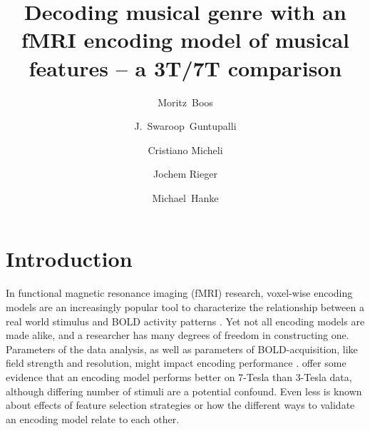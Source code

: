 



\title{Decoding musical genre with an fMRI encoding model of musical
features -- a 3T/7T comparison}


\author[1]{Moritz~Boos}
\author[2]{J.~Swaroop~Guntupalli}
\author[1]{Cristiano Micheli}
\author[1]{Jochem Rieger}
\author[3,4]{Michael~Hanke}

\maketitle
\thispagestyle{fancy}

\listoftodos

\begin{abstract}

\end{abstract}

\clearpage


\section*{Introduction}

In functional magnetic resonance imaging (f{MRI}) research, voxel-wise encoding
models are an increasingly popular tool to characterize the
relationship between a real world stimulus and BOLD activity patterns
\citep{NG11,TD+06,KG+08,SZ09}.
Yet not all encoding models are made alike, and a researcher has many degrees
of freedom in constructing one.
Parameters of the data analysis, as well as parameters of BOLD-acquisition, like field strength and resolution,
might impact encoding performance \citep{KB07,FK12}. \citet{SF14} offer some evidence that an
encoding model performs better on 7-Tesla than 3-Tesla data, although differing
number of stimuli are a potential confound.
Even less is known about effects of feature selection strategies or how
the different ways to validate an encoding model relate to each other. 

